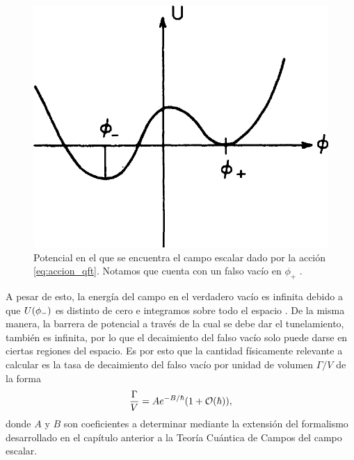 \begin{figure}[t]
	\centering
	\includegraphics[scale=0.25]{FIGURAS/potencial_qft}
	\caption{Potencial en el que se encuentra el campo escalar dado por la acción \eqref{eq:accion_qft}. Notamos que cuenta con un falso vacío en $\phi_+$ \cite{callan1977fate}.}
	\label{fig:potencial_qft}
\end{figure}

A pesar de esto, la energía del campo en el verdadero vacío es infinita debido a que $U\qty(\phi_-)$ es distinto de cero e integramos sobre todo el espacio \cite{paranjape2017theory}. De la misma manera, la barrera de potencial a través de la cual se debe dar el tunelamiento, también es infinita, por lo que el decaimiento del falso vacío solo puede darse en ciertas regiones del espacio. 
Es por esto que la cantidad físicamente relevante a calcular es la tasa de decaimiento del falso vacío por unidad de volumen $\Gamma/V$ \cite{weinberg2012classical} de la forma
\begin{equation} \label{eq:gamma_volumen_WKB}
\frac{\Gamma}{V} = Ae^{-B/\hbar}\qty(1 + \order{\hbar}),
\end{equation}
donde $A$ y $B$ son coeficientes a determinar mediante la extensión del formalismo desarrollado en el capítulo anterior a la Teoría Cuántica de Campos del campo escalar. 

